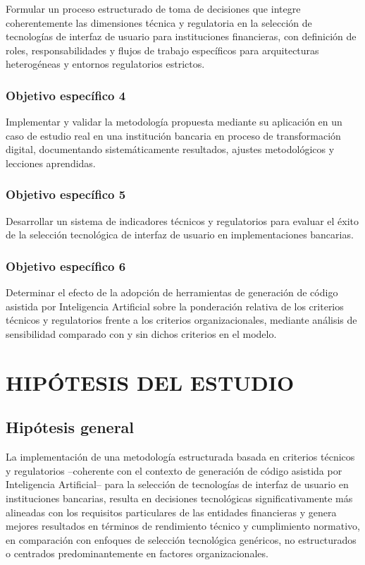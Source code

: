 Formular un proceso estructurado de toma de decisiones que integre
        coherentemente las dimensiones técnica y regulatoria en la selección
        de tecnologías de interfaz de usuario para instituciones financieras,
        con definición de roles, responsabilidades y flujos de trabajo
        específicos para arquitecturas heterogéneas y entornos regulatorios
        estrictos.

\subsubsection{Objetivo específico 4}

Implementar y validar la metodología propuesta mediante su aplicación
        en un caso de estudio real en una institución bancaria en proceso de
        transformación digital, documentando sistemáticamente resultados,
        ajustes metodológicos y lecciones aprendidas.

\subsubsection{Objetivo específico 5}

Desarrollar un sistema de indicadores técnicos y regulatorios para
        evaluar el éxito de la selección tecnológica de interfaz de usuario en
        implementaciones bancarias.

\subsubsection{Objetivo específico 6}

Determinar el efecto de la adopción de herramientas de generación de
        código asistida por Inteligencia Artificial sobre la ponderación relativa
        de los criterios técnicos y regulatorios frente a los criterios
        organizacionales, mediante análisis de sensibilidad comparado con y
        sin dichos criterios en el modelo.

\section{HIPÓTESIS DEL ESTUDIO}

\subsection{Hipótesis general}


La implementación de una metodología estructurada basada en criterios
técnicos y regulatorios --coherente con el contexto de generación de código
asistida por Inteligencia Artificial-- para la selección de tecnologías de
interfaz de usuario en instituciones bancarias, resulta en decisiones
tecnológicas significativamente más alineadas con los requisitos particulares
de las entidades financieras y genera mejores resultados en términos de
rendimiento técnico y cumplimiento normativo, en comparación con enfoques
de selección tecnológica genéricos, no estructurados o centrados
predominantemente en factores organizacionales.


